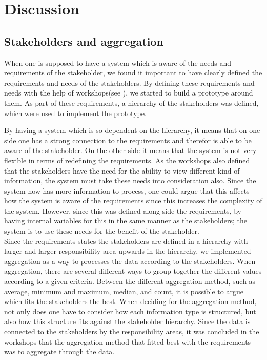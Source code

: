\chapter{Discussion}
\label{chapter:discussion}

\section{Stakeholders and aggregation} %
\label{sec:discussion_stakeholders_and_aggregation}

When one is supposed to have a system which is aware of the needs and
requirements of the stakeholder, we found it important to have clearly 
defined the requirements and needs of the stakeholders. By defining these
requirements and needs with the help of workshops(see ), we 
started to build a prototype around them. As part of these requirements, a 
hierarchy of the stakeholders was defined, which were used to implement the 
prototype.  

By having a system which is so dependent on the hierarchy, it means that on 
one side one has a strong connection to the requirements and therefor is 
able to be aware of the stakeholder. On the other side it means that the 
system is not very flexible in terms of redefining the requirements. As the
workshops also defined that the stakeholders have the need for the ability to 
view different kind of information, the system must take these needs into
consideration also. Since the system now has more information to process, one
could argue that this affects how the system is aware of the requirements 
since this increases the complexity of the system. However, since this was 
defined along side the requirements, by having internal variables for this in 
the same manner as the stakeholders; the system is to use these needs for the
benefit of the stakeholder. \\

Since the requirements states the stakeholders are defined in a hierarchy with
larger and larger responsibility area upwards in the hierarchy, we implemented
aggregation as a way to processes the data according to the stakeholders. When
aggregation, there are several different ways to group together the different
values according to a given criteria. Between the different aggregation method,
such as average, minimum and maximum, median, and count, it is possible to
argue which fits the stakeholders the best. When deciding for the aggregation
method, not only does one have to consider how each information type is
structured, but also how this structure fits against the stakeholder hierarchy.
Since the data is connected to the stakeholders by the responsibility areas, 
it was concluded in the workshops that the aggregation method that fitted best
with the requirements was to aggregate through the data.

